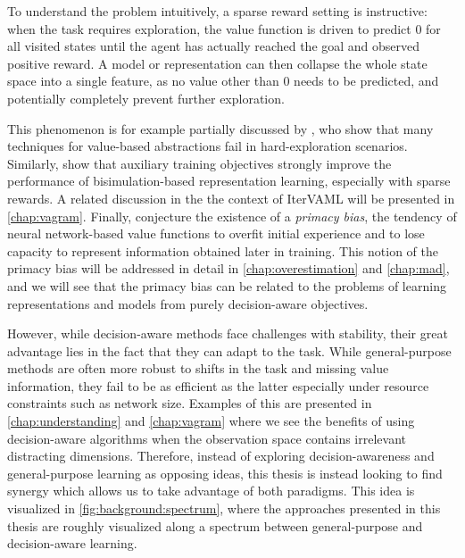 To understand the problem intuitively, a sparse reward setting is instructive: when the task requires exploration, the value function is driven to predict $0$ for all visited states until the agent has actually reached the goal and observed positive reward.
A model or representation can then collapse the whole state space into a single feature, as no value other than 0 needs to be predicted, and potentially completely prevent further exploration.

This phenomenon is for example partially discussed by \textcite{tomar2023learning}, who show that many techniques for value-based abstractions fail in hard-exploration scenarios.
Similarly, \textcite{kemertas2021towards} show that auxiliary training objectives strongly improve the performance of bisimulation-based representation learning, especially with sparse rewards.
A related discussion in the the context of IterVAML will be presented in \autoref{chap:vagram}.
Finally, \textcite{nikishin2022primacy} conjecture the existence of a \emph{primacy bias}, the tendency of neural network-based value functions to overfit initial experience and to lose capacity to represent information obtained later in training.
This notion of the primacy bias will be addressed in detail in \autoref{chap:overestimation} and \autoref{chap:mad}, and we will see that the primacy bias can be related to the problems of learning representations and models from purely decision-aware objectives.

However, while decision-aware methods face challenges with stability, their great advantage lies in the fact that they can adapt to the task.
While general-purpose methods are often more robust to shifts in the task and missing value information, they fail to be as efficient as the latter especially under resource constraints such as network size.
Examples of this are presented in \autoref{chap:understanding} and \autoref{chap:vagram} where we see the benefits of using decision-aware algorithms when the observation space contains irrelevant distracting dimensions.
Therefore, instead of exploring decision-awareness and general-purpose learning as opposing ideas, this thesis is instead looking to find synergy which allows us to take advantage of both paradigms.
This idea is visualized in \autoref{fig:background:spectrum}, where the approaches presented in this thesis are roughly visualized along a spectrum between general-purpose and decision-aware learning.

